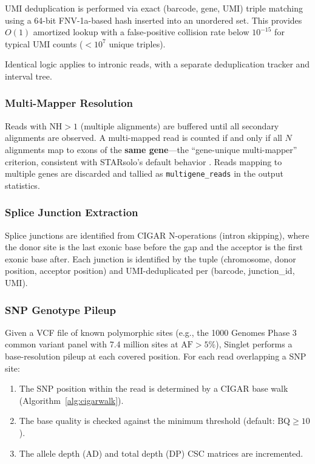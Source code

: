 \documentclass[11pt,a4paper]{article}
\begin{document}
UMI deduplication is performed via exact (barcode, gene, UMI) triple matching using a 64-bit FNV-1a-based hash inserted into an unordered set. This provides $O(1)$ amortized lookup with a false-positive collision rate below $10^{-15}$ for typical UMI counts ($<10^7$ unique triples).

Identical logic applies to intronic reads, with a separate deduplication tracker and interval tree.

\subsubsection{Multi-Mapper Resolution}

Reads with $\text{NH} > 1$ (multiple alignments) are buffered until all secondary alignments are observed. A multi-mapped read is counted if and only if all $N$ alignments map to exons of the \textbf{same gene}---the ``gene-unique multi-mapper'' criterion, consistent with STARsolo's default behavior \citep{kaminow2021starsolo}. Reads mapping to multiple genes are discarded and tallied as \texttt{multigene\_reads} in the output statistics.

\subsubsection{Splice Junction Extraction}

Splice junctions are identified from CIGAR N-operations (intron skipping), where the donor site is the last exonic base before the gap and the acceptor is the first exonic base after. Each junction is identified by the tuple (chromosome, donor position, acceptor position) and UMI-deduplicated per (barcode, junction\_id, UMI).

\subsubsection{SNP Genotype Pileup}

Given a VCF file of known polymorphic sites (e.g., the 1000 Genomes Phase 3 common variant panel with 7.4 million sites at $\text{AF} > 5\%$), Singlet performs a base-resolution pileup at each covered position. For each read overlapping a SNP site:

\begin{enumerate}
    \item The SNP position within the read is determined by a CIGAR base walk (Algorithm~\ref{alg:cigarwalk}).
    \item The base quality is checked against the minimum threshold (default: $\text{BQ} \geq 10$).
    \item The allele depth (AD) and total depth (DP) CSC matrices are incremented.
\end{enumerate}
\end{document}
